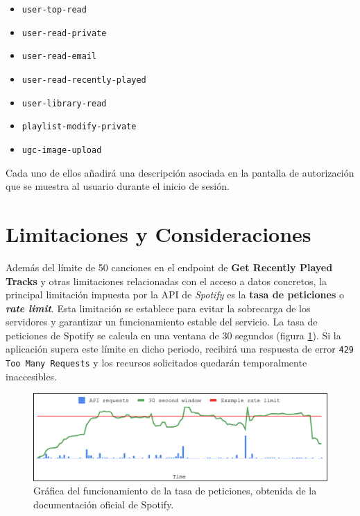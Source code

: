 \setlength{\columnsep}{-1em} %
\begin{multicols}{2} %
    \begin{itemize}
        \setlength{\itemsep}{0.3em} %
        \setlength{\topsep}{0.5em}  %
        \setlength{\parsep}{0pt}    %
        \setlength{\parskip}{0pt}   %
        \item \texttt{user-top-read}
        \item \texttt{user-read-private}
        \item \texttt{user-read-email}
        \item \texttt{user-read-recently-played}
        \item \texttt{user-library-read}
        \item \texttt{playlist-modify-private}
        \item \texttt{ugc-image-upload}
    \end{itemize}
\end{multicols}

Cada uno de ellos añadirá una descripción asociada en la pantalla de autorización que se muestra al usuario durante el inicio de sesión.

\section{Limitaciones y Consideraciones}

Además del límite de 50 canciones en el endpoint de \textbf{Get Recently Played Tracks} y otras limitaciones relacionadas con el acceso a datos concretos, la principal limitación impuesta por la API de \textit{Spotify} es la \textbf{tasa de peticiones} o  \textit{\textbf{rate limit}}. Esta limitación se establece para evitar la sobrecarga de los servidores y garantizar un funcionamiento estable del servicio. La tasa de peticiones de Spotify se calcula en una ventana de 30 segundos (figura \ref{fig:rate_limit}). Si la aplicación supera este límite en dicho periodo, recibirá una respuesta de error \texttt{429 Too Many Requests} y los recursos solicitados quedarán temporalmente inaccesibles.

\begin{figure}[H]
    \centering
    \includegraphics[width=\textwidth]{figures/rate_limit.png}
    \caption{Gráfica del funcionamiento de la tasa de peticiones, obtenida de la documentación oficial de Spotify.}
    \label{fig:rate_limit}
\end{figure}

